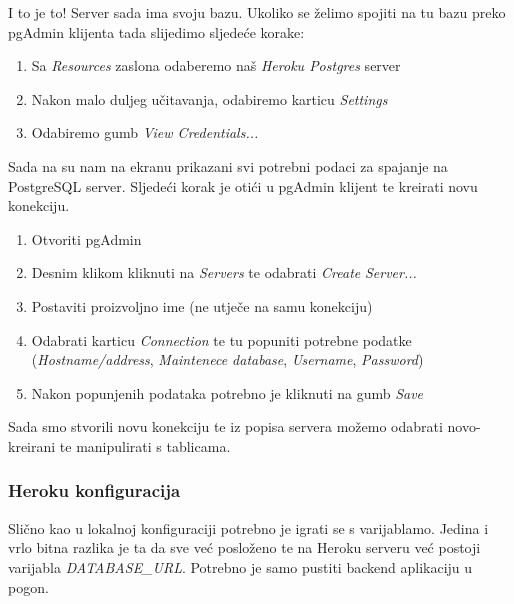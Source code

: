 								I to je to! Server sada ima svoju bazu. Ukoliko se želimo spojiti na tu bazu preko pgAdmin klijenta tada slijedimo sljedeće korake:
								
								\begin{enumerate}
										\item Sa \textit{Resources} zaslona odaberemo naš \textit{Heroku Postgres} server
										\item Nakon malo duljeg učitavanja, odabiremo karticu \textit{Settings}
										\item Odabiremo gumb \textit{View Credentials...}
								\end{enumerate}
								
								Sada na su nam na ekranu prikazani svi potrebni podaci za spajanje na PostgreSQL server. Sljedeći korak je otići u pgAdmin klijent te kreirati novu konekciju.
								
								\begin{enumerate}
										\item Otvoriti pgAdmin
										\item Desnim klikom kliknuti na \textit{Servers} te odabrati \textit{Create} \textit{Server...}
										\item Postaviti proizvoljno ime (ne utječe na samu konekciju)
										\item Odabrati karticu \textit{Connection} te tu popuniti potrebne podatke (\textit{Hostname/address}, \textit{Maintenece database}, \textit{Username}, \textit{Password})
										\item Nakon popunjenih podataka potrebno je kliknuti na gumb \textit{Save}
								\end{enumerate}
								
								Sada smo stvorili novu konekciju te iz popisa servera možemo odabrati novo-kreirani te manipulirati s tablicama.
								
				
						\subsubsection*{Heroku konfiguracija}
							
							Slično kao u lokalnoj konfiguraciji potrebno je igrati se s varijablamo. Jedina i vrlo bitna razlika je ta da sve već posloženo te na Heroku serveru već postoji varijabla \textit{DATABASE\_URL}. Potrebno je samo pustiti backend aplikaciju u pogon.
					
			\eject